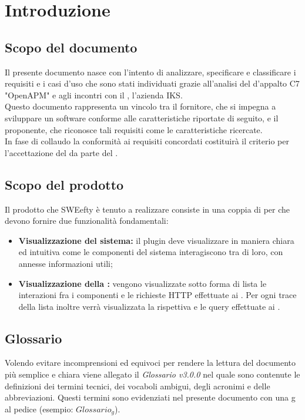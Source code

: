 \section{Introduzione} \label{intro}
	\subsection{Scopo del documento}
	Il presente documento nasce con l'intento di analizzare, specificare e classificare i requisiti e i casi d'uso che sono stati individuati grazie all'analisi del  d'appalto C7 "OpenAPM" e agli incontri con il , l'azienda IKS.\\
	Questo documento rappresenta un vincolo tra il fornitore, che si impegna a sviluppare un software conforme alle caratteristiche riportate di seguito, e il proponente, che riconosce tali requisiti come le caratteristiche ricercate.\\
	In fase di collaudo la conformità ai requisiti concordati costituirà il criterio per l'accettazione del  da parte del .

	\subsection{Scopo del prodotto}
	Il prodotto che SWEefty è tenuto a realizzare consiste in una coppia di  per  che devono fornire due funzionalità fondamentali:
	\begin{itemize}
		\item \textbf{Visualizzazione  del sistema:} il plugin deve visualizzare in maniera chiara ed intuitiva come le componenti del sistema interagiscono tra di loro, con annesse informazioni utili;
		\item \textbf{Visualizzazione della :} vengono visualizzate sotto forma di lista le interazioni fra i componenti e le richieste HTTP effettuate ai . Per ogni trace della lista inoltre verrà visualizzata la rispettiva  e le query effettuate ai .
	\end{itemize}

	\subsection{Glossario}
		Volendo evitare incomprensioni  ed equivoci per rendere la lettura del documento più semplice e chiara viene allegato il \emph{Glossario v3.0.0} nel quale sono contenute le definizioni dei termini tecnici, dei vocaboli ambigui, degli acronimi e delle abbreviazioni. Questi termini sono evidenziati nel presente documento con una g al pedice (esempio: $Glossario_{g}$).
